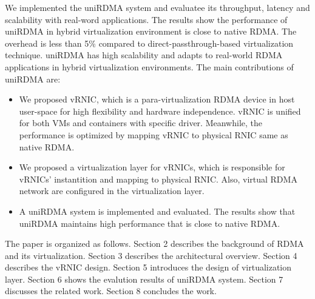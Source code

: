 We implemented the uniRDMA system and evaluatee its throughput, latency and scalability with real-word applications. The results show the performance of uniRDMA  in hybrid virtualization environment is close to native RDMA. The overhead is less than 5\% compared to direct-passthrough-based virtualization technique. uniRDMA has high scalability and adapts to real-world RDMA applications in hybrid virtualization environments. The main contributions of uniRDMA are:

\begin{itemize}
	\item We proposed vRNIC, which is a para-virtualization RDMA device in host user-space for high flexibility and hardware independence. vRNIC is unified for both VMs and containers with specific driver. Meanwhile, the performance is optimized by mapping vRNIC to physical RNIC same as native RDMA.
	
	\item We proposed a virtualization layer for vRNICs, which is responsible for vRNICs' instantition and mapping to physical RNIC. Also, virtual RDMA network are configured in the virtualization layer.
	
	\item A uniRDMA system is implemented and evaluated. The results show that uniRDMA maintains high performance that is close to native RDMA.
\end{itemize}

The paper is organized as follows. Section 2 describes the background of RDMA and its virtualization. Section 3 describes the architectural overview. Section 4 describes the vRNIC design. Section 5 introduces the design of virtualization layer. Section 6 shows the evalution results of uniRDMA system. Section 7 discusses the related work. Section 8 concludes the work.